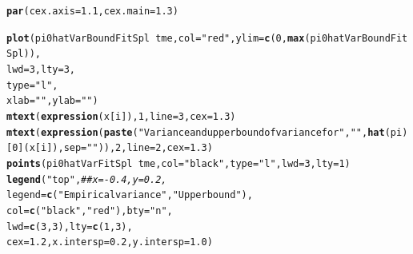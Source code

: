 \documentclass{article}\usepackage[]{graphicx}\usepackage[]{color}
\makeatletter
\newcommand{\hlnum}[1]{\textcolor[rgb]{0.686,0.059,0.569}{#1}}%
\newcommand{\hlstr}[1]{\textcolor[rgb]{0.192,0.494,0.8}{#1}}%
\newcommand{\hlcom}[1]{\textcolor[rgb]{0.678,0.584,0.686}{\textit{#1}}}%
\newcommand{\hlopt}[1]{\textcolor[rgb]{0,0,0}{#1}}%
\newcommand{\hlstd}[1]{\textcolor[rgb]{0.345,0.345,0.345}{#1}}%
\newcommand{\hlkwc}[1]{\textcolor[rgb]{0.333,0.667,0.333}{#1}}%
\newcommand{\hlkwd}[1]{\textcolor[rgb]{0.737,0.353,0.396}{\textbf{#1}}}%
\newenvironment{kframe}{%
 \def\at@end@of@kframe{}%
 \ifinner\ifhmode%
  \def\at@end@of@kframe{\end{minipage}}%
  \begin{minipage}{\columnwidth}%
 \fi\fi%
 \def\FrameCommand##1{\hskip\@totalleftmargin \hskip-\fboxsep
 \colorbox{shadecolor}{##1}\hskip-\fboxsep
     \hskip-\linewidth \hskip-\@totalleftmargin \hskip\columnwidth}%
 \MakeFramed {\advance\hsize-\width
   \@totalleftmargin\z@ \linewidth\hsize
   \@setminipage}}%
 {\par\unskip\endMakeFramed%
 \at@end@of@kframe}
\newenvironment{knitrout}{}{} %
\makeatother
\begin{document}
\begin{knitrout}
\color{fgcolor}\begin{kframe}
\begin{alltt}
\hlkwd{par}\hlstd{(}\hlkwc{cex.axis} \hlstd{=} \hlnum{1.1}\hlstd{,} \hlkwc{cex.main}\hlstd{=}\hlnum{1.3}\hlstd{)}

\hlkwd{plot}\hlstd{(pi0hatVarBoundFitSpl} \hlopt{~} \hlstd{tme,} \hlkwc{col}\hlstd{=}\hlstr{"red"}\hlstd{,} \hlkwc{ylim}\hlstd{=}\hlkwd{c}\hlstd{(}\hlnum{0}\hlstd{,} \hlkwd{max}\hlstd{(pi0hatVarBoundFitSpl)),}
     \hlkwc{lwd}\hlstd{=}\hlnum{3}\hlstd{,} \hlkwc{lty}\hlstd{=}\hlnum{3}\hlstd{,}
     \hlkwc{type}\hlstd{=}\hlstr{"l"}\hlstd{,}
     \hlkwc{xlab}\hlstd{=}\hlstr{""}\hlstd{,} \hlkwc{ylab}\hlstd{=}\hlstr{""}\hlstd{)}
\hlkwd{mtext}\hlstd{(}\hlkwd{expression}\hlstd{(x[i]),} \hlnum{1}\hlstd{,} \hlkwc{line}\hlstd{=}\hlnum{3}\hlstd{,} \hlkwc{cex}\hlstd{=}\hlnum{1.3}\hlstd{)}
\hlkwd{mtext}\hlstd{(}\hlkwd{expression}\hlstd{(}\hlkwd{paste}\hlstd{(}\hlstr{"Variance and upper bound of variance for "}\hlstd{,} \hlstr{" "}\hlstd{,} \hlkwd{hat}\hlstd{(pi)[}\hlnum{0}\hlstd{](x[i]),} \hlkwc{sep}\hlstd{=}\hlstr{" "}\hlstd{)),} \hlnum{2}\hlstd{,} \hlkwc{line}\hlstd{=}\hlnum{2}\hlstd{,} \hlkwc{cex}\hlstd{=}\hlnum{1.3}\hlstd{)}
\hlkwd{points}\hlstd{(pi0hatVarFitSpl} \hlopt{~} \hlstd{tme,} \hlkwc{col}\hlstd{=}\hlstr{"black"}\hlstd{,} \hlkwc{type}\hlstd{=}\hlstr{"l"}\hlstd{,} \hlkwc{lwd}\hlstd{=}\hlnum{3}\hlstd{,} \hlkwc{lty}\hlstd{=}\hlnum{1}\hlstd{)}
\hlkwd{legend}\hlstd{(}\hlstr{"top"}\hlstd{,} \hlcom{##x=-0.4, y=0.2, }
       \hlkwc{legend}\hlstd{=}\hlkwd{c}\hlstd{(}\hlstr{"Empirical variance"}\hlstd{,} \hlstr{"Upper bound"}\hlstd{),}
       \hlkwc{col}\hlstd{=}\hlkwd{c}\hlstd{(}\hlstr{"black"}\hlstd{,} \hlstr{"red"}\hlstd{),} \hlkwc{bty}\hlstd{=}\hlstr{"n"}\hlstd{,}
       \hlkwc{lwd}\hlstd{=}\hlkwd{c}\hlstd{(}\hlnum{3}\hlstd{,}\hlnum{3}\hlstd{),} \hlkwc{lty}\hlstd{=}\hlkwd{c}\hlstd{(}\hlnum{1}\hlstd{,}\hlnum{3}\hlstd{),}
       \hlkwc{cex}\hlstd{=}\hlnum{1.2}\hlstd{,} \hlkwc{x.intersp}\hlstd{=}\hlnum{0.2}\hlstd{,} \hlkwc{y.intersp}\hlstd{=}\hlnum{1.0}\hlstd{)}
\end{alltt}
\end{kframe}


\end{knitrout}
\end{document}
